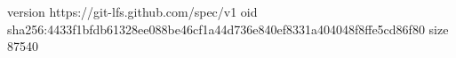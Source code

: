 version https://git-lfs.github.com/spec/v1
oid sha256:4433f1bfdb61328ee088be46cf1a44d736e840ef8331a404048f8ffe5cd86f80
size 87540
